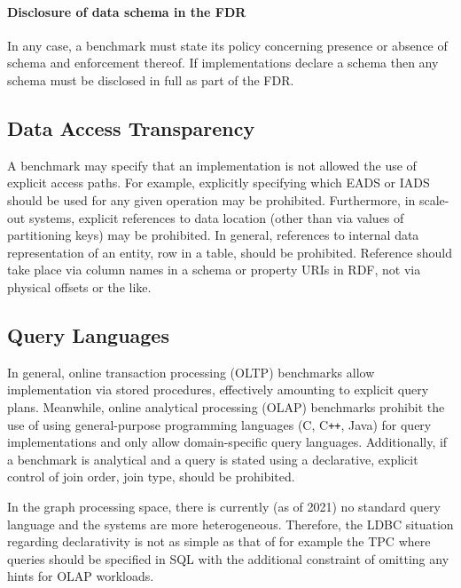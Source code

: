 \paragraph{Disclosure of data schema in the FDR}
In any case, a benchmark must state its policy concerning presence or absence of schema and enforcement thereof. If implementations declare a schema then any schema must be disclosed in full as part of the FDR.

\subsection{Data Access Transparency}

A benchmark may specify that an implementation is not allowed the use of explicit access paths. For example, explicitly specifying which EADS or IADS should be used for any given operation may be prohibited. Furthermore, in scale-out systems, explicit references to data location (other than via values of partitioning keys) may be prohibited. In general, references to internal data representation of an entity, \eg row in a table, should be prohibited. Reference should take place via column names in a schema or property URIs in RDF, not via physical offsets or the like.

\subsection{Query Languages}
\label{sec:query-languages}

In general, online transaction processing (OLTP) benchmarks allow implementation via stored procedures, effectively amounting to explicit query plans.
Meanwhile, online analytical processing (OLAP) benchmarks prohibit the use of using general-purpose programming languages (\eg C, C\texttt{++}, Java) for query implementations and only allow domain-specific query languages.
Additionally, if a benchmark is analytical and a query is stated using a declarative, explicit control of join order, join type, \etc should be prohibited.

In the graph processing space, there is currently (as of 2021) no standard query language and the systems are more heterogeneous.
Therefore, the LDBC situation regarding declarativity is not as simple as that of for example the TPC where queries should be specified in SQL with the additional constraint of omitting any hints for OLAP workloads.

